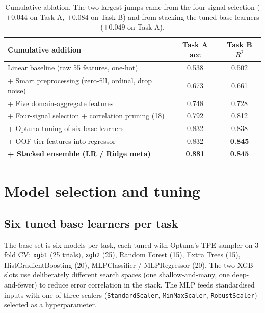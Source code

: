 \documentclass[11pt,a4paper]{article}
\begin{document}
\begin{table}[h]
\centering
\small
\begin{tabular}{p{8cm}cc}
\toprule
\textbf{Cumulative addition} & \textbf{Task A acc} & \textbf{Task B $R^2$} \\
\midrule
Linear baseline (raw 55 features, one-hot)             & 0.538 & 0.502 \\
+ Smart preprocessing (zero-fill, ordinal, drop noise) & 0.673 & 0.661 \\
+ Five domain-aggregate features                       & 0.748 & 0.728 \\
+ Four-signal selection + correlation pruning (18)     & 0.792 & 0.812 \\
+ Optuna tuning of six base learners                   & 0.832 & 0.838 \\
+ OOF tier features into regressor                     & 0.832 & \textbf{0.845} \\
\textbf{+ Stacked ensemble (LR / Ridge meta)}          & \textbf{0.881} & \textbf{0.845} \\
\bottomrule
\end{tabular}
\caption{Cumulative ablation. The two largest jumps came from the four-signal selection ($+0.044$ on Task A, $+0.084$ on Task B) and from stacking the tuned base learners ($+0.049$ on Task A).}
\label{tab:ablation}
\end{table}

\section{Model selection and tuning}
\label{sec:models}

\subsection*{Six tuned base learners per task}

The base set is six models per task, each tuned with Optuna's TPE sampler on 3-fold CV: \texttt{xgb1} (25 trials), \texttt{xgb2} (25), Random Forest (15), Extra Trees (15), HistGradientBoosting (20), MLPClassifier / MLPRegressor (20). The two XGB slots use deliberately different search spaces (one shallow-and-many, one deep-and-fewer) to reduce error correlation in the stack. The MLP feeds standardised inputs with one of three scalers (\texttt{StandardScaler}, \texttt{MinMaxScaler}, \texttt{RobustScaler}) selected as a hyperparameter.
\end{document}
